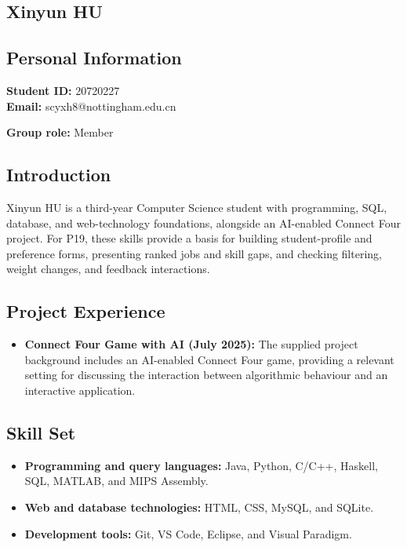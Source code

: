 \documentclass[a4paper,12pt]{article}
\newcommand{\PersonalInformation}[2]{%
  \subsection*{Personal Information}
  \if\relax\detokenize{#1}\relax\else
  \noindent\textbf{Student ID:} #1\\
  \fi
  \textbf{Email:} #2\par
}
\begin{document}
\subsection{Xinyun HU}
\PersonalInformation{20720227}{scyxh8@nottingham.edu.cn}
\noindent\textbf{Group role:} Member\par

\subsection*{Introduction}
Xinyun HU is a third-year Computer Science student with programming, SQL, database, and web-technology foundations, alongside an AI-enabled Connect Four project. For P19, these skills provide a basis for building student-profile and preference forms, presenting ranked jobs and skill gaps, and checking filtering, weight changes, and feedback interactions.

\subsection*{Project Experience}
\begin{itemize}
  \item \textbf{Connect Four Game with AI (July 2025):} The supplied project background includes an AI-enabled Connect Four game, providing a relevant setting for discussing the interaction between algorithmic behaviour and an interactive application.
\end{itemize}

\subsection*{Skill Set}
\begin{itemize}
  \item \textbf{Programming and query languages:} Java, Python, C/C++, Haskell, SQL, MATLAB, and MIPS Assembly.
  \item \textbf{Web and database technologies:} HTML, CSS, MySQL, and SQLite.
  \item \textbf{Development tools:} Git, VS Code, Eclipse, and Visual Paradigm.
\end{itemize}
\end{document}

